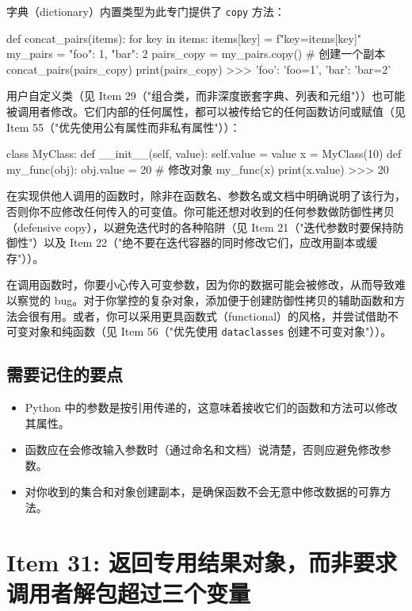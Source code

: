 字典（dictionary）内置类型为此专门提供了 \texttt{copy} 方法：

\begin{codebox}[python]
def concat_pairs(items):
    for key in items:
        items[key] = f"{key}={items[key]}"
my_pairs = {"foo": 1, "bar": 2}
pairs_copy = my_pairs.copy()  # 创建一个副本
concat_pairs(pairs_copy)
print(pairs_copy)
>>>
{'foo': 'foo=1', 'bar': 'bar=2'}
\end{codebox}

用户自定义类（见 Item 29（"组合类，而非深度嵌套字典、列表和元组"））也可能被调用者修改。它们内部的任何属性，都可以被传给它的任何函数访问或赋值（见 Item 55（"优先使用公有属性而非私有属性"））：

\begin{codebox}[python]
class MyClass:
    def __init__(self, value):
        self.value = value
x = MyClass(10)
def my_func(obj):
    obj.value = 20  # 修改对象
my_func(x)
print(x.value)
>>>
20
\end{codebox}

在实现供他人调用的函数时，除非在函数名、参数名或文档中明确说明了该行为，否则你不应修改任何传入的可变值。你可能还想对收到的任何参数做防御性拷贝（defensive copy），以避免迭代时的各种陷阱（见 Item 21（"迭代参数时要保持防御性"）以及 Item 22（"绝不要在迭代容器的同时修改它们，应改用副本或缓存"））。

在调用函数时，你要小心传入可变参数，因为你的数据可能会被修改，从而导致难以察觉的 bug。对于你掌控的复杂对象，添加便于创建防御性拷贝的辅助函数和方法会很有用。或者，你可以采用更具函数式（functional）的风格，并尝试借助不可变对象和纯函数（见 Item 56（"优先使用 \texttt{dataclasses} 创建不可变对象"））。

\subsection{需要记住的要点}

\begin{itemize}
\item Python 中的参数是按引用传递的，这意味着接收它们的函数和方法可以修改其属性。
\item 函数应在会修改输入参数时（通过命名和文档）说清楚，否则应避免修改参数。
\item 对你收到的集合和对象创建副本，是确保函数不会无意中修改数据的可靠方法。
\end{itemize}

\section{Item 31: 返回专用结果对象，而非要求调用者解包超过三个变量}

